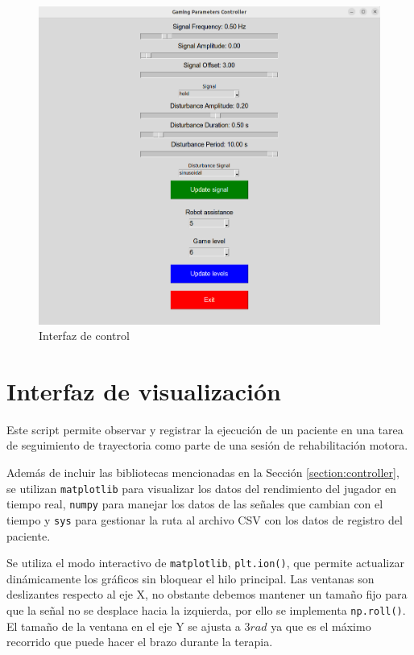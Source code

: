 \begin{figure}[ht!]
	\centering
	\begin{minipage}{0.85\linewidth}
		\centering
		\includegraphics[width=\linewidth]{figs/control_pannel.png}
	\end{minipage}
	\caption[Interfaz de control]{Interfaz de control}
	\label{fig:control}
\end{figure}

\section{Interfaz de visualización}

Este script permite observar y registrar la ejecución de un paciente en una tarea de seguimiento de trayectoria como parte de una sesión de rehabilitación motora.

Además de incluir las bibliotecas mencionadas en la Sección \ref{section:controller}, se utilizan \verb|matplotlib| para visualizar los datos del rendimiento del jugador en tiempo real, \verb|numpy| para manejar los datos de las señales que cambian con el tiempo y \verb|sys| para gestionar la ruta al archivo CSV con los datos de registro del paciente.

Se utiliza el modo interactivo de \verb|matplotlib|, \verb|plt.ion()|, que permite actualizar dinámicamente los gráficos sin bloquear el hilo principal.
Las ventanas son deslizantes respecto al eje X, no obstante debemos mantener un tamaño fijo para que la señal no se desplace hacia la izquierda, por ello se implementa \verb|np.roll()|.
El tamaño de la ventana en el eje Y se ajusta a $3 rad$ ya que es el máximo recorrido que puede hacer el brazo durante la terapia.

